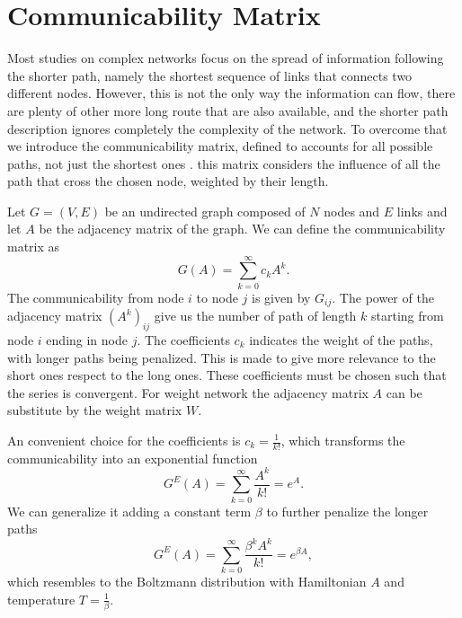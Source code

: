 \section{Communicability Matrix}

Most studies on complex networks focus on the spread of information following the shorter path, namely the shortest sequence of links that connects two different nodes. 
However, this is not the only way the information can flow, there are plenty of other more long route that are also available, and the shorter path description ignores completely the complexity of the network.
To overcome that we introduce the communicability matrix, defined to accounts for all possible paths, not just the shortest ones \cite{Estrada_2012}. this matrix considers the influence of all the path that cross the chosen node, weighted by their length.

Let $G=(V,E)$ be an undirected graph composed of $N$ nodes and $E$ links and let $A$ be the adjacency matrix of the graph.
We can define the communicability matrix as
\begin{equation}
    G(A) = \sum_{k=0}^{\infty}c_k A^k.
\end{equation}
The communicability from node $i$ to node $j$ is given by $G_{ij}$. The power of the adjacency matrix $(A^k)_{ij}$ give us the number of path of length $k$ starting from node $i$ ending in node $j$.
The coefficients $c_k$ indicates the weight of the paths, with longer paths being penalized. This is made to give more relevance to the short ones respect to the long ones. These coefficients must be chosen such that the series is convergent.
For weight network the adjacency matrix $A$ can be substitute by the weight matrix $W$.

An convenient choice for the coefficients is $c_k = \frac{1}{k!}$, which transforms the communicability into an exponential function \cite{Estrada_2008}
\begin{equation}\label{G_E}
    G^E(A) =\sum_{k=0}^{\infty} \frac{A^k}{k!} = e^{A} .
\end{equation}
We can generalize it adding a constant term $\beta$ to further penalize the longer paths
\begin{equation}
    G^E(A) =\sum_{k=0}^{\infty} \frac{\beta^k A^k}{k!} = e^{\beta A} ,
\end{equation}
which resembles to the Boltzmann distribution with Hamiltonian $A$ and temperature $T = \frac{1}{\beta}$.

